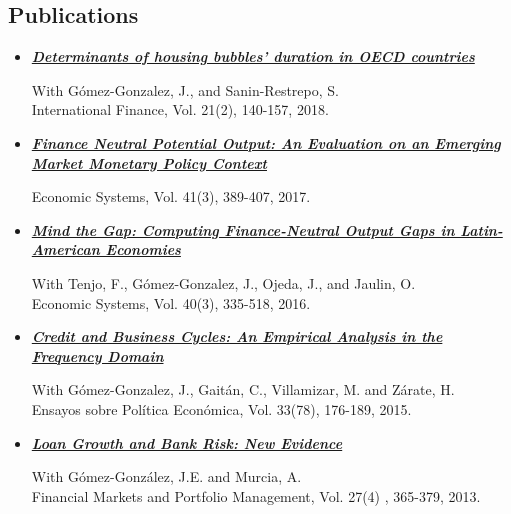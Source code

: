 \documentclass{res}
\begin{document}
\begin{normalsize}
\section{\textbf{Publications}}
\begin{itemize}
\item \href{https://onlinelibrary.wiley.com/doi/abs/10.1111/infi.12128}{\textbf{\textit{Determinants of housing bubbles' duration in OECD countries}}}\\ 
\begin{small}
With G\'{o}mez-Gonzalez, J., and Sanin-Restrepo, S.
\\International Finance, Vol. 21(2), 140-157, 2018.
\end{small}
\item \href{http://www.sciencedirect.com/science/article/pii/S0939362517300328}{\textbf{\textit{Finance Neutral Potential Output: An Evaluation on an Emerging Market Monetary Policy Context}}}\\ 
\begin{small}
Economic Systems, Vol. 41(3), 389-407, 2017.
\end{small}
\item \href{http://www.sciencedirect.com/science/article/pii/S0939362516300292}{\textbf{\textit{Mind the Gap: Computing Finance-Neutral Output Gaps in Latin-American Economies}}}\\
\begin{small}
With Tenjo, F., G\'{o}mez-Gonzalez, J., Ojeda, J., and Jaulin, O.\\ Economic Systems, Vol. 40(3), 335-518, 2016.
\end{small}
\item \href{http://www.elsevier.es/es-revista-ensayos-sobre-politica-economica-387-articulo-credit-business-cycles-causal-effects-S0120448315000421?redirectNew=true}{\textbf{\textit{Credit and Business Cycles: An Empirical Analysis in the Frequency Domain}}}\\ 
\begin{small}
With G\'{o}mez-Gonzalez, J., Gait\'{a}n, C., Villamizar, M. and Z\'{a}rate, H.\\ Ensayos sobre Pol\'{i}tica Econ\'{o}mica, Vol. 33(78), 176-189, 2015.
\end{small}
\item \href{http://rd.springer.com/article/10.1007\%2Fs11408-013-0217-6\#page-1}{\textbf{\textit{Loan Growth and Bank Risk: New Evidence}}} \\ 
\begin{small}
With G\'{o}mez-Gonz\'{a}lez, J.E. and Murcia, A. \\Financial Markets and Portfolio Management, Vol. 27(4) , 365-379, 2013.

\end{small}
\end{itemize}
\end{normalsize}
\end{document}
